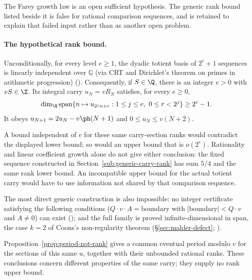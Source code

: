 The Farey growth law is an open sufficient hypothesis. The generic
rank bound listed beside it is false for rational comparison
sequences, and is retained to explain that failed input rather than
as another open problem.

\paragraph{The hypothetical rank bound.}
Unconditionally, for every level $e\ge1$, the dyadic totient basis of
$2^e+1$ sequences is linearly independent over $\mathbb{Q}$ (via CRT and
Dirichlet's theorem on primes in arithmetic progression)
().
Consequently, if $S\in\Q$, there is an integer $v>0$ with $vS\in\Z$.
Its integral carry $u_N=vR_N$ satisfies, for every $e\ge0$,
\[
 \dim_{\Q}\operatorname{span}
 \{n\mapsto u_{2^j n+r}:1\le j\le e,\ 0\le r<2^j\}\ge2^e-1.
\]
It obeys $u_{N+1}=2u_N-v\ph(N+1)$ and $0\le u_N\le v(N+2)$.

A bound independent of $e$ for these same carry-section ranks would
contradict the displayed lower bound; so would an upper bound that is
$o(2^e)$. Rationality and linear coefficient growth alone do not give
either conclusion: the fixed sequence constructed in
Section~\ref{sub:generic-carry-rank} has sum $5/4$ and the same rank
lower bound. An incompatible upper bound for the actual totient carry
would have to use information not shared by that comparison sequence.

The most direct generic construction is also impossible: no
integer certificate satisfying the following conditions ($Q\cdot v\cdot A =
\mathrm{boundary}$ with $|\mathrm{boundary}|<Q\cdot v$ and $A\ne0$) can
exist ();
and the full family is proved infinite-dimensional in
span, the case $k=2$ of Coons's non-regularity theorem
(\S\ref{sec:mahler-defect};
).

Proposition~\ref{prop:period-not-rank} gives a common eventual period
modulo $v$ for the sections of this same $u$, together with their
unbounded rational ranks. These conclusions concern different properties of the same carry; they supply no rank
upper bound.

